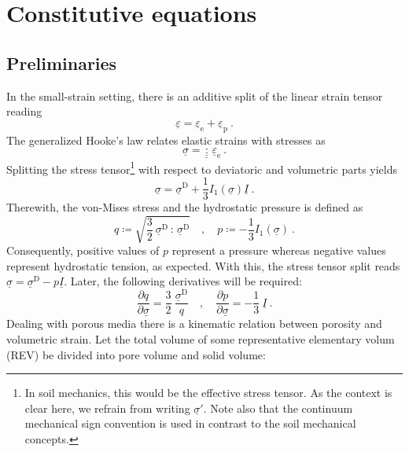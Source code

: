 \documentclass[paper=a4, twoside, pagesize]{scrartcl}
\newcommand{\tensor}[1]{\underline{#1}}
\newcommand{\tensorf}[1]{\underline{\underline{#1}}}
\newcommand{\ppkt}{\,\colon\,}
\newcommand{\D}{\text{D}}
\newcommand{\e}{\text{e}}
\newcommand{\p}{\text{p}}
\begin{document}
\section{Constitutive equations}

\subsection{Preliminaries}

In the small-strain setting, there is an additive split of the linear strain tensor reading
\begin{equation}\label{eq:elasticplastic}
  \tensor\varepsilon = \tensor\varepsilon_\e + \tensor\varepsilon_\p \ .
\end{equation}
The generalized Hooke's law relates elastic strains with stresses as
\begin{equation}\label{eq:Hooke}
  \tensor\sigma = \tensorf\ppkt\tensor\varepsilon_\e \ .
\end{equation}
Splitting the stress tensor\footnote{In soil mechanics, this would be the effective stress tensor. As the context is clear here, we refrain from writing $\tensor\sigma'$. Note also that the continuum mechanical sign convention is used in contrast to the soil mechanical concepts.} with respect to deviatoric and volumetric parts yields
\begin{equation}\label{eq:decomposition}
  \tensor\sigma = \tensor\sigma ^\D + \frac{1}{3}I_1(\tensor\sigma)\tensor I \ .
\end{equation}
Therewith, the von-Mises stress and the hydrostatic pressure is defined as
\begin{equation}
  q \coloneqq \sqrt{\frac{3}{2}\ \tensor\sigma^\D\ppkt\tensor\sigma^\D} \quad,\quad p \coloneqq -\frac{1}{3}I_1(\tensor\sigma) \ .
\end{equation}
Consequently, positive values of $p$ represent a pressure whereas negative values represent hydrostatic tension, as expected.
With this, the stress tensor split reads $\tensor\sigma = \tensor\sigma^\D - p\tensor I$. Later, the following derivatives will be required:
\begin{equation}
  \frac{\partial q}{\partial \tensor\sigma} = \frac{3}{2}\ \frac{\tensor\sigma^\D}{q}\quad,\quad \frac{\partial p}{\partial \tensor\sigma} = -\frac{1}{3}\ \tensor I \ .
\end{equation}
Dealing with porous media there is a kinematic relation between porosity and volumetric strain. Let the total volume of some representative elementary volum (REV) be divided into pore volume and solid volume:
\end{document}
